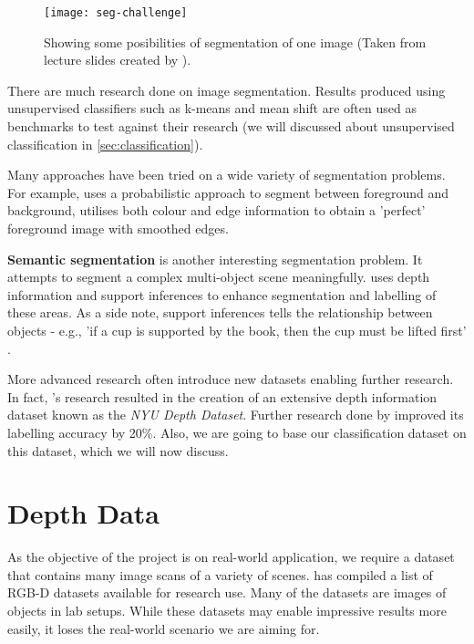 \begin{figure}[H]
  \centering
  \texttt{[image: seg-challenge]}
  \caption{Showing some posibilities of segmentation of one image (Taken from lecture slides created by \protect{}).}
  \label{fig:seg-challenge}
\end{figure}

There are much research done on image segmentation. Results produced using unsupervised classifiers such as k-means and mean shift are often used as benchmarks to test against their research (we will discussed about unsupervised classification in \autoref{sec:classification}).

Many approaches have been tried on a wide variety of segmentation problems. For example,  uses a probabilistic approach to segment between foreground and background,  utilises both colour and edge information to obtain a 'perfect' foreground image with smoothed edges.

\textbf{Semantic segmentation} is another interesting segmentation problem. It attempts to segment a complex multi-object scene meaningfully.  uses depth information and support inferences to enhance segmentation and labelling of these areas. As a side note, support inferences tells the relationship between objects - e.g., 'if a cup is supported by the book, then the cup must be lifted first' \cite{nyu-dataset}.

More advanced research often introduce new datasets enabling further research. In fact, 's research resulted in the creation of an extensive depth information dataset known as the \textit{NYU Depth Dataset}. Further research done by  improved its labelling accuracy by 20\%. Also, we are going to base our classification dataset on this dataset, which we will now discuss.


\newpage
\section{Depth Data} \label{sec:lit-depth-data}
As the objective of the project is on real-world application, we require a dataset that contains many image scans of a variety of scenes.  has compiled a list of RGB-D datasets available for research use. Many of the datasets are images of objects in lab setups. While these datasets may enable impressive results more easily, it loses the real-world scenario we are aiming for.

